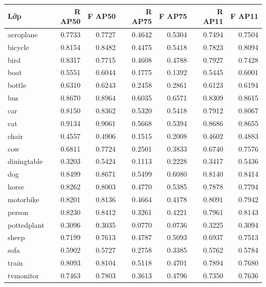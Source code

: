 \begin{tabular}{lrrrrrr}
\toprule
Lớp & R AP50 & F AP50 & R AP75 & F AP75 & R AP11 & F AP11\\
\midrule
aeroplane & 0.7733 & 0.7727 & 0.4642 & 0.5304 & 0.7494 & 0.7504\\
bicycle & 0.8154 & 0.8482 & 0.4475 & 0.5418 & 0.7823 & 0.8094\\
bird & 0.8317 & 0.7715 & 0.4608 & 0.4788 & 0.7927 & 0.7428\\
boat & 0.5551 & 0.6044 & 0.1775 & 0.1392 & 0.5445 & 0.6001\\
bottle & 0.6310 & 0.6243 & 0.2458 & 0.2861 & 0.6123 & 0.6194\\
bus & 0.8670 & 0.8964 & 0.6035 & 0.6571 & 0.8309 & 0.8615\\
car & 0.8150 & 0.8362 & 0.5320 & 0.5418 & 0.7912 & 0.8067\\
cat & 0.9134 & 0.9061 & 0.5668 & 0.5394 & 0.8686 & 0.8655\\
chair & 0.4557 & 0.4906 & 0.1515 & 0.2008 & 0.4602 & 0.4883\\
cow & 0.6811 & 0.7724 & 0.2501 & 0.3833 & 0.6740 & 0.7576\\
diningtable & 0.3203 & 0.5424 & 0.1113 & 0.2228 & 0.3417 & 0.5436\\
dog & 0.8499 & 0.8671 & 0.5499 & 0.6080 & 0.8140 & 0.8414\\
horse & 0.8262 & 0.8003 & 0.4770 & 0.5385 & 0.7878 & 0.7794\\
motorbike & 0.8201 & 0.8136 & 0.4664 & 0.4178 & 0.8091 & 0.7942\\
person & 0.8230 & 0.8412 & 0.3261 & 0.4221 & 0.7961 & 0.8143\\
pottedplant & 0.3096 & 0.3035 & 0.0770 & 0.0736 & 0.3225 & 0.3094\\
sheep & 0.7199 & 0.7613 & 0.4787 & 0.5093 & 0.6937 & 0.7513\\
sofa & 0.5902 & 0.5727 & 0.2758 & 0.3385 & 0.5762 & 0.5784\\
train & 0.8093 & 0.8104 & 0.5118 & 0.4701 & 0.7894 & 0.7680\\
tvmonitor & 0.7463 & 0.7803 & 0.3613 & 0.4796 & 0.7350 & 0.7636\\
\bottomrule
\end{tabular}
